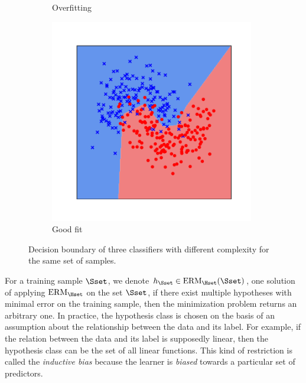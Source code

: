 \begin{figure}[t]
\begin{subfigure}[b]{0.32\textwidth}
    \caption{Overfitting}
    \label{figure:ch2-fitting_points_b}
  \end{subfigure}
  \hfill
  \begin{subfigure}[b]{0.32\textwidth}
    \includegraphics[width=0.98\textwidth]{figures/main/ch2-background/normal.pdf}
    \caption{Good fit}
    \label{figure:ch2-fitting_points_c}
  \end{subfigure}
  \caption{
    Decision boundary of three classifiers with different complexity for the same set of samples.
  }
  \label{figure:ch2-fitting_points}
\end{figure}


For a training sample $\Sset$, we denote $h_\Sset \in \mathrm{ERM}_{\Hset}(\Sset)$, one solution of applying $\mathrm{ERM}_\Hset$ on the set $\Sset$, if there exist multiple hypotheses with minimal error on the training sample, then the minimization problem returns an arbitrary one.
In practice, the hypothesis class is chosen on the basis of an assumption about the relationship between the data and its label.
For example, if the relation between the data and its label is supposedly linear, then the hypothesis class can be the set of all linear functions.
This kind of restriction is called the \emph{inductive bias} because the learner is \emph{biased} towards a particular set of predictors.

